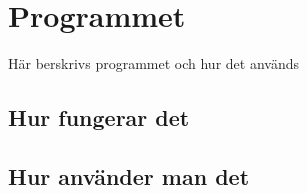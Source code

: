 \section{Programmet}
Här berskrivs programmet och hur det används 
\subsection{Hur fungerar det}
\subsection{Hur använder man det}